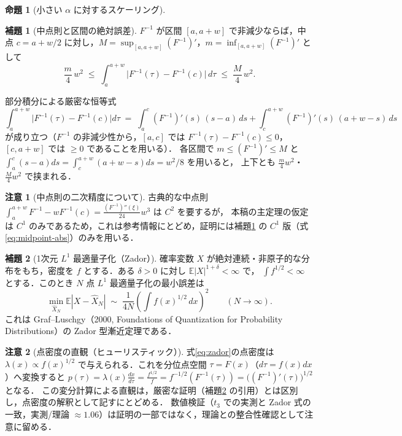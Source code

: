 \documentclass[a4paper,10pt]{jsarticle}
\makeatletter
\theoremstyle{definition}
\newtheorem{proposition}{命題}[section]
\newtheorem{lemma}{補題}[section]
\newtheorem{remark}{注意}[section]
\renewenvironment{proof}[1][\proofname]{\par
  \pushQED{\qed}%
  \normalfont \topsep6\p@\@plus6\p@\relax
  \trivlist
  \item[\hskip\labelsep\textbf{#1}]\ignorespaces
}{%
  \popQED\endtrivlist\@endpefalse
}
\renewcommand{\proofname}{証明}
\newcommand{\Finv}{F^{-1}}
\newcommand{\E}{\mathbb{E}}
\makeatother
\begin{document}
\begin{proposition}[小さい $\alpha$ に対するスケーリング]
\begin{lemma}[中点則と区間の絶対誤差]
\label{lem:midpoint}
$\Finv$ が区間 $[a,a+w]$ で非減少ならば，中点 $c=a+w/2$ に対し，$M=\sup_{[a,a+w]}(\Finv)'$，$m=\inf_{[a,a+w]}(\Finv)'$ として
\begin{equation}
  \frac{m}{4}\,w^2
  \;\le\;\int_a^{a+w}\bigl|\Finv(\tau)-\Finv(c)\bigr|\,d\tau
  \;\le\;\frac{M}{4}\,w^2 .
  \label{eq:midpoint-abs}
\end{equation}
\end{lemma}
\begin{proof}
部分積分による厳密な恒等式
\begin{equation*}
  \int_a^{a+w}\bigl|\Finv(\tau)-\Finv(c)\bigr|d\tau
  \;=\;\int_a^{c}(\Finv)'(s)\,(s-a)\,ds+\int_c^{a+w}(\Finv)'(s)\,(a+w-s)\,ds
\end{equation*}
が成り立つ（$\Finv$ の非減少性から，$[a,c]$ では $\Finv(\tau)-\Finv(c)\le0$，$[c,a+w]$ では $\ge0$ であることを用いる）．
各区間で $m\le(\Finv)'\le M$ と $\int_a^c(s-a)ds=\int_c^{a+w}(a+w-s)ds=w^2/8$ を用いると，
上下とも $\frac{m}{4}w^2$・$\frac{M}{4}w^2$ で挟まれる．
\end{proof}

\begin{remark}[中点則の二次精度について]
古典的な中点則 $\int_a^{a+w}\Finv-w\Finv(c)=\frac{(\Finv)''(\xi)}{24}w^3$ は $C^2$ を要するが，
本稿の主定理の仮定は $C^1$ のみであるため，これは参考情報にとどめ，証明には補題\ref{lem:midpoint} の $C^1$ 版（式\eqref{eq:midpoint-abs}）のみを用いる．
\end{remark}

\begin{lemma}[1次元 $L^1$ 最適量子化（Zador）]
\label{lem:zador}
確率変数 $X$ が絶対連続・非原子的な分布をもち，密度を $f$ とする．ある $\delta>0$ に対し $\E|X|^{1+\delta}<\infty$ で，
$\int f^{1/2}<\infty$ とする．このとき $N$ 点 $L^1$ 最適量子化の最小誤差は
\begin{equation}
  \min_{\hat X_N}\E|X-\hat X_N|
  \;\sim\;\frac1{4N}\left(\int f(x)^{1/2}\,dx\right)^{2}
  \qquad(N\to\infty).
  \label{eq:zador}
\end{equation}
これは Graf--Luschgy（2000, Foundations of Quantization for Probability Distributions）の Zador 型漸近定理である．
\end{lemma}

\begin{remark}[点密度の直観（ヒューリスティック）]
式\eqref{eq:zador}の点密度は $\lambda(x)\propto f(x)^{1/2}$ で与えられる．これを分位点空間 $\tau=F(x)$（$d\tau=f(x)dx$）へ変換すると
$p(\tau)=\lambda(x)\frac{dx}{d\tau}=\frac{f^{1/2}}{f}=f^{-1/2}(F^{-1}(\tau))=\bigl((\Finv)'(\tau)\bigr)^{1/2}$ となる．
この変分計算による直観は，厳密な証明（補題\ref{lem:zador} の引用）とは区別し，点密度の解釈として記すにとどめる．
数値検証（$t_3$ での実測と Zador 式の一致，実測/理論 $\approx1.06$）は証明の一部ではなく，理論との整合性確認として注意に留める．
\end{remark}


\end{proposition}
\end{document}
